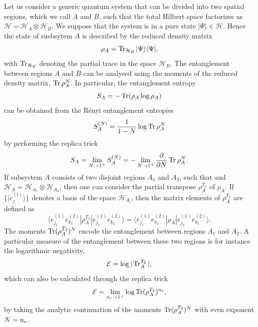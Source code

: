 \documentclass[a4paper,11pt]{article}
\def\Tr{\mathop{\mbox{\normalfont Tr}}\nolimits}
\begin{document}
Let us consider a generic quantum system that can be divided into two 
spatial regions, which we call $A$ and $B$, such that the total Hilbert 
space factorizes as $\mathcal{H}=\mathcal{H}_A\otimes \mathcal{H}_B$.
We suppose that the system is in a pure state $|\Psi\rangle\in\mathcal{H}$. 
Hence the state of susbsytem $A$ is described by the reduced density matrix
\begin{equation}\label{red_density_matrix}
\rho_A=\Tr_{\mathcal{H}_B}|\Psi\rangle\langle\Psi|,
\end{equation}
with $\Tr_{\mathcal{H}_B}$ denoting the partial trace in the space $\mathcal{H}_B$. 
The entanglement between regions $A$ and $B$ can be analysed using the moments of the 
reduced density matrix, $\Tr\rho_A^N$. In particular, the entanglement entropy 
\begin{equation}
 S_A=-\Tr(\rho_A\log \rho_A)
\end{equation}
can be obtained from the R\'enyi entanglement entropies 
\begin{equation}
 S_A^{(N)}=\frac{1}{1-N}\log\Tr\rho_A^N
\end{equation}
by performing the replica trick
\begin{equation}
 S_A=\lim_{N\to 1^+}S_A^{(N)}=-\lim_{N\to1^+}\frac{\partial}{\partial N}\Tr\rho_A^N.
\end{equation}
If subsystem $A$ consists of two disjoint regions $A_1$ and $A_2$, 
such that and $\mathcal{H}_A=\mathcal{H}_{A_1}\otimes\mathcal{H}_{A_2}$,
then one can consider the partial transpose $\rho_A^{T_2}$ of $\rho_A$. 
If $\{|e_j^{(l)}\rangle\}$ denotes a basis of the space $\mathcal{H}_{A_l}$, 
then the matrix elements of $\rho_A^{T_2}$ are defined as 
\begin{equation}\label{partial_transpose}
\langle e_{j_1}^{(1)}e_{k_1}^{(2)}| \rho_A^{T_2} |e_{j_2}^{(1)}e_{k_2}^{(2)}\rangle=
\langle e_{j_1}^{(1)}e_{k_2}^{(2)}| \rho_A |e_{j_2}^{(1)}e_{k_1}^{(2)}\rangle.
\end{equation}
The moments $\Tr(\rho_A^{T_2})^N$ encode the entanglement between regions $A_1$ and $A_2$. 
A particular measure of the entanglement between these two regions is for instance the 
logarithmic negativity,
\begin{equation}
 \mathcal{E}=\log|\Tr_A^{T_2}|,
\end{equation}
which can also be calculated through the replica trick 
\begin{equation}
 \mathcal{E}=\lim_{n_{\rm e}\to 1^+}\log\Tr(\rho_A^{T_2})^{n_{\rm e}},
\end{equation}
by taking the analytic continuation of the moments $\Tr(\rho_A^{T_2})^N$
with even exponent $N=n_{\rm e}$.
\end{document}
